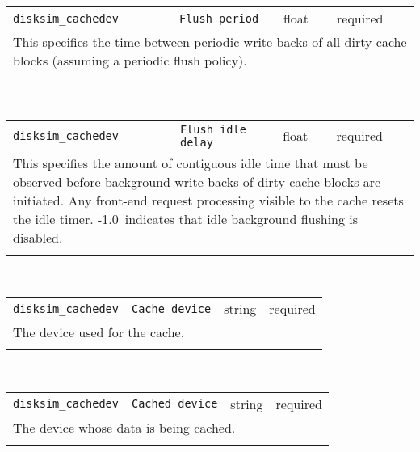 \noindent 
\begin{tabular}{|p{\lpmodwidth}|p{\lpnamewidth}|p{0.5in}|p{0.5in}|}
\cline{1-4}
\texttt{disksim\_cachedev} & \texttt{Flush period} & float & required \\ 
\cline{1-4}
\multicolumn{4}{|p{6in}|}{
This specifies the time between periodic write-backs of all dirty cache
blocks (assuming a periodic flush policy).
}\\ 
\cline{1-4}
\multicolumn{4}{p{5in}}{}\\
\end{tabular}\\ 
\noindent 
\begin{tabular}{|p{\lpmodwidth}|p{\lpnamewidth}|p{0.5in}|p{0.5in}|}
\cline{1-4}
\texttt{disksim\_cachedev} & \texttt{Flush idle delay} & float & required \\ 
\cline{1-4}
\multicolumn{4}{|p{6in}|}{
This specifies the amount of contiguous idle time that must be observed
before background write-backs of dirty cache blocks are initiated.
Any front-end request processing visible to the cache resets the idle
timer. -1.0~indicates that idle background flushing is disabled.
}\\ 
\cline{1-4}
\multicolumn{4}{p{5in}}{}\\
\end{tabular}\\ 
\noindent 
\begin{tabular}{|p{\lpmodwidth}|p{\lpnamewidth}|p{0.5in}|p{0.5in}|}
\cline{1-4}
\texttt{disksim\_cachedev} & \texttt{Cache device} & string & required \\ 
\cline{1-4}
\multicolumn{4}{|p{6in}|}{
The device used for the cache.
}\\ 
\cline{1-4}
\multicolumn{4}{p{5in}}{}\\
\end{tabular}\\ 
\noindent 
\begin{tabular}{|p{\lpmodwidth}|p{\lpnamewidth}|p{0.5in}|p{0.5in}|}
\cline{1-4}
\texttt{disksim\_cachedev} & \texttt{Cached device} & string & required \\ 
\cline{1-4}
\multicolumn{4}{|p{6in}|}{
The device whose data is being cached.
}\\ 
\cline{1-4}
\multicolumn{4}{p{5in}}{}\\
\end{tabular}\\ 
